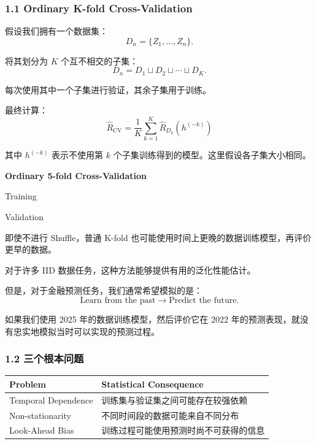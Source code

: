 \hypertarget{part-2-27-0001-ordinary-k-fold-cross-validation}{%
\subsubsection{1.1 Ordinary K-fold Cross-Validation}\label{part-2-27-0001-ordinary-k-fold-cross-validation}}

假设我们拥有一个数据集：
\[D_n=\{Z_1,\ldots,Z_n\}.\]

将其划分为 \(K\) 个互不相交的子集：
\[D_n=D_1\sqcup D_2\sqcup\cdots\sqcup D_K.\]

每次使用其中一个子集进行验证，其余子集用于训练。

最终计算：
\[\boxed{
\widehat R_{\mathrm{CV}}
=
\frac1K\sum_{k=1}^{K}
\widehat R_{D_k}(h^{(-k)})
}\]

其中 \(h^{(-k)}\) 表示不使用第 \(k\) 个子集训练得到的模型。这里假设各子集大小相同。

\textbf{Ordinary 5-fold Cross-Validation}


Training

Validation

即使不进行 Shuffle，普通 K-fold 也可能使用时间上更晚的数据训练模型，再评价更早的数据。

对于许多 IID 数据任务，这种方法能够提供有用的泛化性能估计。

但是，对于金融预测任务，我们通常希望模拟的是：
\[\text{Learn from the past}
\longrightarrow
\text{Predict the future}.\]

如果我们使用 2025 年的数据训练模型，然后评价它在 2022 年的预测表现，就没有忠实地模拟当时可以实现的预测过程。

\hypertarget{part-2-27-0001-ux4e09ux4e2aux6839ux672cux95eeux9898}{%
\subsubsection{1.2 三个根本问题}\label{part-2-27-0001-ux4e09ux4e2aux6839ux672cux95eeux9898}}

\begin{readertable}
\begin{longtable}[]{@{}
  >{\raggedright\arraybackslash}p{}
  >{\raggedright\arraybackslash}p{}@{}}
\toprule
Problem & Statistical Consequence \\
\midrule
\endhead
Temporal Dependence & 训练集与验证集之间可能存在较强依赖 \\
Non-stationarity & 不同时间段的数据可能来自不同分布 \\
Look-Ahead Bias & 训练过程可能使用预测时尚不可获得的信息 \\
\bottomrule
\end{longtable}
\end{readertable}

